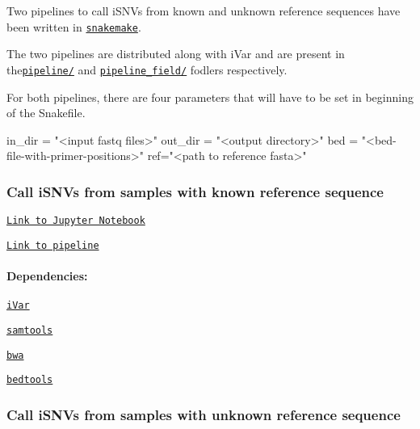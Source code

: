 Two pipelines to call i\+S\+N\+Vs from known and unknown reference sequences have been written in \href{https://snakemake.readthedocs.io/en/stable/}{\tt snakemake}.

The two pipelines are distributed along with i\+Var and are present in the\href{https://github.com/andersen-lab/ivar/tree/master/pipeline}{\tt pipeline/} and \href{https://github.com/andersen-lab/ivar/tree/master/pipeline_field}{\tt pipeline\+\_\+field/} fodlers respectively.

For both pipelines, there are four parameters that will have to be set in beginning of the Snakefile.


\begin{DoxyCode}
in\_dir = "<input fastq files>"
out\_dir = "<output directory>"
bed = "<bed-file-with-primer-positions>"
ref="<path to reference fasta>"
\end{DoxyCode}




\subsubsection*{Call i\+S\+N\+Vs from samples with known reference sequence}

\href{https://github.com/andersen-lab/paper_2018_primalseq-ivar/blob/master/cookbook/CookBook.ipynb}{\tt Link to Jupyter Notebook}

\href{https://github.com/andersen-lab/ivar/tree/master/pipeline}{\tt Link to pipeline}

\paragraph*{Dependencies\+:}


\begin{DoxyItemize}
\item \href{https://github.com/andersen-lab/ivar}{\tt i\+Var}
\item \href{https://htslib.org/}{\tt samtools}
\item \href{https://github.com/lh3/bwa}{\tt bwa}
\item \href{https://bedtools.readthedocs.io/en/latest/}{\tt bedtools}
\end{DoxyItemize}

\subsubsection*{Call i\+S\+N\+Vs from samples with unknown reference sequence}

